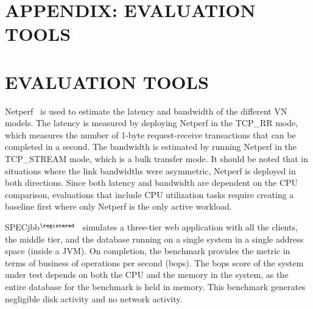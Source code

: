 %

{\chapter*{APPENDIX: EVALUATION TOOLS}
\label{evaluation_tools}
\setcounter{chapter}{1}}
{\chapter{EVALUATION TOOLS}
\label{evaluation_tools}}

Netperf~\cite{netperf} is used to estimate the latency and bandwidth of the
different VN models. The latency is measured by deploying Netperf in the
TCP\_RR mode, which measures the number of 1-byte request-receive transactions
that can be completed in a second. The bandwidth is estimated by running Netperf
in the TCP\_STREAM mode, which is a bulk transfer mode. It should be noted that
in situations where the link bandwidths were asymmetric, Netperf is deployed in
both directions.  Since both latency and bandwidth are dependent on the CPU
comparison, evaluations that include CPU utilization tasks require creating
a baseline first where only Netperf is the only active workload.

SPECjbb$^\registered$~\cite{specjbb} simulates a three-tier web application with all the
clients, the middle tier, and the database running on a single system in a
single address space (inside a JVM). On completion, the benchmark provides the
metric in terms of business of operations per second (bops). The bops score of
the system under test depends on both the CPU and the memory in the system, as
the entire database for the benchmark is held in memory. This benchmark
generates negligible disk activity and no network activity. 
